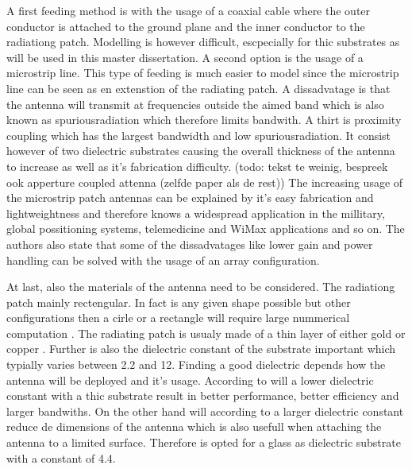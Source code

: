 A first feeding method is with the usage of a coaxial cable where the outer conductor is attached to the ground plane and the inner conductor to the radiationg patch. Modelling is however difficult, escpecially for thic substrates as will be used in this master dissertation.
A second option is the usage of a microstrip line. This type of feeding is much easier to model since the microstrip line can be seen as en extenstion of the radiating patch. A dissadvatage is that the antenna will transmit at frequencies outside the aimed band which
is also known as \gls{spuriousradiation} which therefore  limits bandwith.
A thirt is proximity coupling which has the largest bandwidth and low \gls{spuriousradiation}. It consist however of two dielectric substrates causing the overall thickness
of the antenna to increase as well as it's fabrication difficulty.
(todo: tekst te weinig, bespreek ook apperture coupled attenna (zelfde paper als de rest))
The increasing usage of the microstrip patch antennas can be explained by it's easy fabrication and lightweightness and therefore knows a widespread application in the millitary, global possitioning systems, telemedicine and WiMax applications and so on.
The authors also state that some of the dissadvatages like lower gain and power handling can be solved with the usage of an array configuration.

At last, also the materials of the antenna need to be considered. The radiationg patch mainly rectengular. In fact is any given shape possible but other configurations
then a cirle or a rectangle will require large nummerical computation \cite{J14_antennadesign}. The radiating patch is usualy made of a thin layer of either gold or copper \cite{J14_antennadesign,J15_antennadesign}. 
Further is also the dielectric constant of the substrate important which typially varies between 2.2 and 12. Finding a good dielectric depends how the antenna will be deployed and it's usage. According to  \cite{J15_antennadesign} will a lower
dielectric constant with a thic substrate result in better performance, better efficiency and larger bandwiths. On the other hand will according to \cite{J14_antennadesign} a larger dielectric constant reduce de dimensions of the antenna which is also usefull when attaching the 
antenna to a limited surface. Therefore is opted for a glass as dielectric substrate with a constant of 4.4.